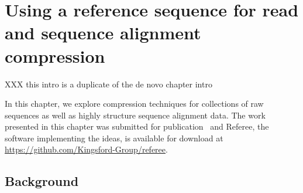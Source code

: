 \documentclass[12pt]{cmuthesis}
\newcommand{\refer}{\textsc{Referee}\xspace}
\begin{document}
\chapter{Using a reference sequence for read and sequence alignment compression}

XXX this intro is a duplicate of the de novo chapter intro


In this chapter, we explore compression techniques for collections of raw sequences as well as highly structure sequence alignment data. The work presented in this chapter was submitted for publication~\cite{Referee_draft} and Referee, the software implementing the ideas, is available for download at \url{https://github.com/Kingsford-Group/referee}.



\section{Background}


\end{document}
